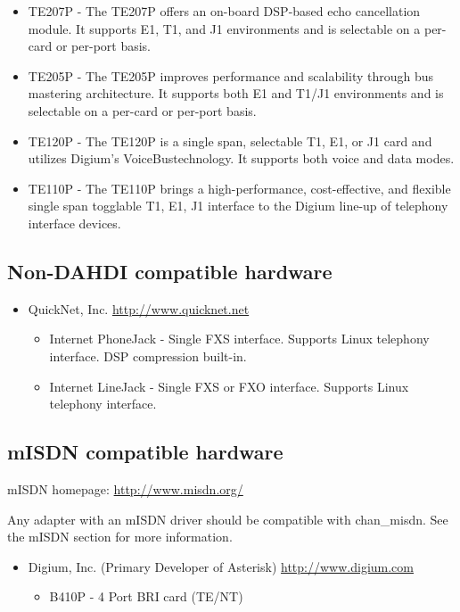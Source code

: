 \begin{itemize}
\begin{itemize}
\begin{itemize}
       \item TE207P - The TE207P offers an on-board DSP-based echo cancellation module. It supports E1, T1, and J1 environments and is selectable on a per-card or per-port basis.
       \item TE205P - The TE205P improves performance and scalability through bus mastering architecture. It supports both E1 and T1/J1 environments and is selectable on a per-card or per-port basis.
       \item TE120P - The TE120P is a single span, selectable T1, E1, or J1 card and utilizes Digium's VoiceBus\texttrademark technology. It supports both voice and data modes.       
       \item TE110P - The TE110P brings a high-performance, cost-effective, and flexible single span togglable T1, E1, J1 interface to the Digium line-up of telephony interface devices.
     \end{itemize}
  \end{itemize}
\end{itemize}

\subsection{Non-DAHDI compatible hardware}

\begin{itemize}
  \item QuickNet, Inc. 
        \url{http://www.quicknet.net}
  \begin{itemize}
    \item Internet PhoneJack - Single FXS interface.  Supports Linux telephony
          interface.  DSP compression built-in.

    \item Internet LineJack - Single FXS or FXO interface.  Supports Linux 
          telephony interface.
  \end{itemize}
\end{itemize}

\subsection{mISDN compatible hardware}

mISDN homepage:  \url{http://www.misdn.org/}

Any adapter with an mISDN driver should be compatible with
chan\_misdn. See the mISDN section for more information.

\begin{itemize}
  \item Digium, Inc. (Primary Developer of Asterisk) 
  \url{http://www.digium.com}
  \begin{itemize}
    \item B410P - 4 Port BRI card (TE/NT)
   \end{itemize}
\end{itemize}


